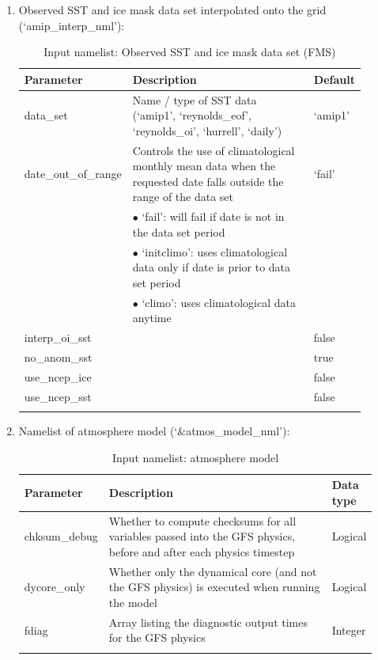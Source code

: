 \documentclass[11pt,fleqn]{report}              %
\begin{document}
\begin{enumerate}

\item Observed SST and ice mask data set interpolated onto the grid (`amip\_interp\_nml'):
{
\scriptsize
\begin{longtable}{p{0.15\linewidth} | p{0.67\linewidth} | p{0.08\linewidth} }
\hline
\hline
 Parameter & Description & Default \\
\hline
 data\_set & Name / type of SST data  (`amip1', `reynolds\_eof', `reynolds\_oi', `hurrell', `daily') & `amip1' \\
 date\_out\_of\_range & Controls the use of climatological monthly mean data when the requested date falls outside the range of the data set   & `fail' \\
  & $\bullet$ `fail': will fail if date is not in the data set period & \\
  & $\bullet$ `initclimo': uses climatological data only if date is prior to data set period  &  \\
  & $\bullet$ `climo': uses climatological data anytime & \\
 interp\_oi\_sst &   & false \\
 no\_anom\_sst & & true \\
 use\_ncep\_ice & & false \\
 use\_ncep\_sst & & false \\
\hline
\caption{Input namelist: Observed SST and ice mask data set (FMS)}
\label{table:fv3_input_nml_amip_interp}
\end{longtable}
}

\item Namelist of atmosphere model (`\&atmos\_model\_nml'):
{
\scriptsize
\begin{longtable}{ p{0.12\linewidth} | p{0.73\linewidth} | p{0.08\linewidth} }
\hline
\hline
 Parameter & Description & Data type \\
\hline
 chksum\_debug & Whether to compute checksums for all variables passed into the GFS physics, before and after each physics timestep & Logical \\
 dycore\_only & Whether only the dynamical core (and not the GFS physics) is executed when running the model & Logical \\
 fdiag & Array listing the diagnostic output times for the GFS physics & Integer \\
\hline
\caption{Input namelist: atmosphere model}
\label{table:fv3_input_nml_atmos}
\end{longtable}
}


\end{enumerate}
\end{document}
